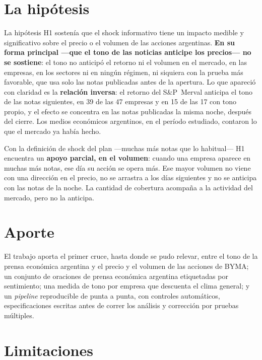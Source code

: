 \section{La hipótesis}

La hipótesis H1 sostenía que el shock informativo tiene un impacto medible y significativo
sobre el precio o el volumen de las acciones argentinas. \textbf{En su forma principal —que el
tono de las noticias anticipe los precios— no se sostiene}: el tono no anticipó el retorno ni el
volumen en el mercado, en las empresas, en los sectores ni en ningún régimen, ni siquiera con la
prueba más favorable, que usa solo las notas publicadas antes de la apertura. Lo que apareció
con claridad es la \textbf{relación inversa}: el retorno del S\&P~Merval anticipa el tono de las
notas siguientes, en 39 de las 47 empresas y en 15 de las 17 con tono propio, y el efecto se
concentra en las notas publicadas la misma noche, después del cierre. Los medios económicos
argentinos, en el período estudiado, contaron lo que el mercado ya había hecho.

Con la definición de shock del plan —muchas más notas que lo habitual— H1 encuentra un
\textbf{apoyo parcial, en el volumen}: cuando una empresa aparece en muchas más notas, ese día
su acción se opera más. Ese mayor volumen no viene con una dirección en el precio, no se
arrastra a los días siguientes y no se anticipa con las notas de la noche. La cantidad de
cobertura acompaña a la actividad del mercado, pero no la anticipa.

\section{Aporte}

El trabajo aporta el primer cruce, hasta donde se pudo relevar, entre el tono de la prensa
económica argentina y el precio y el volumen de las acciones de BYMA; un conjunto de oraciones
de prensa económica argentina etiquetadas por sentimiento; una medida de tono por empresa que
descuenta el clima general; y un \textit{pipeline} reproducible de punta a punta, con controles
automáticos, especificaciones escritas antes de correr los análisis y corrección por pruebas
múltiples.

\section{Limitaciones}
\label{sec:limitaciones}

